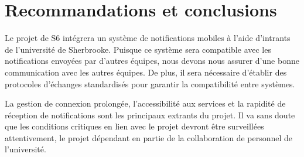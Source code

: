 \section{Recommandations et conclusions}
Le projet de S6 intégrera un système de notifications mobiles à l’aide d’intrants de l’université de Sherbrooke. Puisque ce système sera compatible avec les notifications envoyées par d’autres équipes, nous devons nous assurer d’une bonne communication avec les autres équipes. De plus, il sera nécessaire d’établir des protocoles d’échanges standardisés pour garantir la compatibilité entre systèmes. 

La gestion de connexion prolongée, l'accessibilité aux services et la rapidité de réception de notifications sont les principaux extrants du projet. Il va sans doute que les conditions critiques en lien avec le projet devront être surveillées attentivement, le projet dépendant en partie de la collaboration de personnel de l’université.
